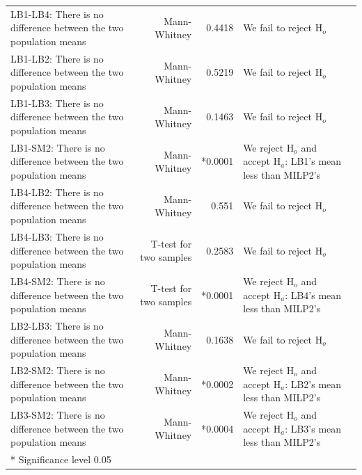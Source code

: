 \begin{table}[H]
{\begin{tabular}{>{\RaggedRight}p{5.5cm}rr>{\RaggedRight}p{5.5cm}r}
LB1-LB4: There is no difference between the two population means & Mann-Whitney & 0.4418 & We fail to reject $\text{H}_o$ \\
LB1-LB2: There is no difference between the two population means & Mann-Whitney & 0.5219 & We fail to reject $\text{H}_o$ \\
LB1-LB3: There is no difference between the two population means & Mann-Whitney & 0.1463 & We fail to reject $\text{H}_o$ \\
LB1-SM2: There is no difference between the two population means & Mann-Whitney & *0.0001 & We reject $\text{H}_o$ and accept $\text{H}_a$: LB1's mean less than MILP2's \\
LB4-LB2: There is no difference between the two population means & Mann-Whitney & 0.551 & We fail to reject $\text{H}_o$ \\
LB4-LB3: There is no difference between the two population means & T-test for two samples & 0.2583 & We fail to reject $\text{H}_o$ \\
LB4-SM2: There is no difference between the two population means & T-test for two samples & *0.0001 & We reject $\text{H}_o$ and accept $\text{H}_a$: LB4's mean less than MILP2's \\
LB2-LB3: There is no difference between the two population means & Mann-Whitney & 0.1638 & We fail to reject $\text{H}_o$ \\
LB2-SM2: There is no difference between the two population means & Mann-Whitney & *0.0002 & We reject $\text{H}_o$ and accept $\text{H}_a$: LB2's mean less than MILP2's \\
LB3-SM2: There is no difference between the two population means & Mann-Whitney & *0.0004 & We reject $\text{H}_o$ and accept $\text{H}_a$: LB3's mean less than MILP2's \\
\bottomrule
*  Significance level 0.05
\end{tabular}
}
\end{table}



